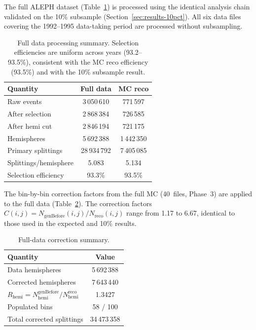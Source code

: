 \documentclass[11pt,a4paper]{article}
\begin{document}
The full ALEPH dataset (Table~\ref{tbl:full-summary}) is processed using
the identical analysis chain validated on the 10\% subsample
(Section~\ref{sec:results-10pct}).  All six data files covering the
1992--1995 data-taking period are processed without subsampling.

\begin{table}[htbp]
\centering
\caption{Full data processing summary.  Selection efficiencies are
  uniform across years (93.2--93.5\%), consistent with the MC reco
  efficiency (93.5\%) and with the 10\% subsample result.}
\label{tbl:full-summary}
\begin{tabular}{lcc}
\toprule
Quantity & Full data & MC reco \\
\midrule
Raw events & 3\,050\,610 & 771\,597 \\
After selection & 2\,868\,384 & 726\,585 \\
After hemi cut & 2\,846\,194 & 721\,175 \\
Hemispheres & 5\,692\,388 & 1\,442\,350 \\
Primary splittings & 28\,934\,792 & 7\,405\,085 \\
Splittings/hemisphere & 5.083 & 5.134 \\
Selection efficiency & 93.3\% & 93.5\% \\
\bottomrule
\end{tabular}
\end{table}

The bin-by-bin correction factors from the full MC (40~files, Phase~3)
are applied to the full data (Table~\ref{tbl:full-correction}).
The correction factors
$C(i,j) = N_\text{genBefore}(i,j) / N_\text{reco}(i,j)$ range from 1.17
to 6.67, identical to those used in the expected and 10\% results.

\begin{table}[htbp]
\centering
\caption{Full-data correction summary.}
\label{tbl:full-correction}
\begin{tabular}{lc}
\toprule
Quantity & Value \\
\midrule
Data hemispheres & 5\,692\,388 \\
Corrected hemispheres & 7\,643\,440 \\
$R_\text{hemi} = N_\text{hemi}^\text{genBefore} / N_\text{hemi}^\text{reco}$ & 1.3427 \\
Populated bins & 58 / 100 \\
Total corrected splittings & 34\,473\,358 \\
\bottomrule
\end{tabular}
\end{table}
\end{document}
